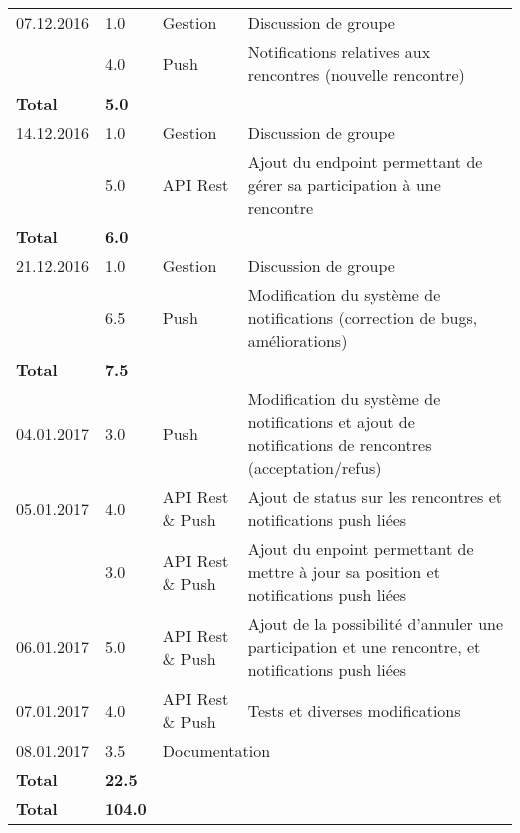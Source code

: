 \documentclass[french]{article}
\begin{document}
\begin{longtable}{p{}|p{}|p{}|p{}}
		\hline
		07.12.2016 & 1.0 & Gestion & Discussion de groupe \\
				   & 4.0 & Push & Notifications relatives aux rencontres (nouvelle rencontre) \\
		\textbf{Total} & \textbf{5.0} && \\

		\hline
		14.12.2016 & 1.0 & Gestion & Discussion de groupe \\
				   & 5.0 & API Rest & Ajout du endpoint permettant de gérer sa participation à une rencontre \\
		\textbf{Total} & \textbf{6.0} && \\

		\hline
		21.12.2016 & 1.0 & Gestion & Discussion de groupe \\
				   & 6.5 & Push & Modification du système de notifications (correction de bugs, améliorations) \\
	   \textbf{Total} & \textbf{7.5} && \\

		\hline
		04.01.2017 & 3.0 & Push & Modification du système de notifications et ajout de notifications de rencontres (acceptation/refus) \\
		05.01.2017 & 4.0 & API Rest \& Push & Ajout de status sur les rencontres et notifications push liées \\
				   & 3.0 & API Rest \& Push & Ajout du enpoint permettant de mettre à jour sa position et notifications push liées \\
		06.01.2017 & 5.0 & API Rest \& Push & Ajout de la possibilité d'annuler une participation et une rencontre, et notifications push liées \\
		07.01.2017 & 4.0 & API Rest \& Push & Tests et diverses modifications \\
		08.01.2017 & 3.5 & \multicolumn{2}{l}{Documentation} \\
		\textbf{Total} & \textbf{22.5} && \\

		\hline
		\hline

		\textbf{Total} & \textbf{104.0} && \\

		\hline
	\end{longtable}
\end{document}
